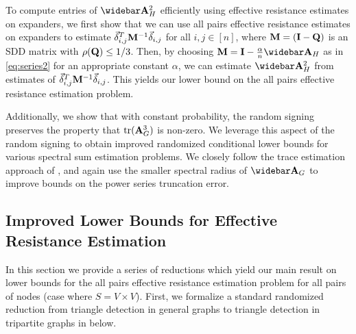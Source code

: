 To compute entries of $\As_{\Gprime}^2$ efficiently using effective resistance estimates on expanders, we first show that we can use all pairs effective resistance estimates on expanders to estimate $\vec{\delta}_{i,j}^T \mathbf{M}^{-1} \vec{\delta}_{i,j}$ for all $i,j \in [n]$, where $\mathbf{M} = (\mathbf{I} - \mathbf{Q})$ is an SDD matrix with $\rho(\mathbf{Q}) \leq 1/3$. Then, by choosing $\M = \I - \frac{\alpha}{n} \As_{\Gprime}$ as in \eqref{eq:series2} for an appropriate constant $\alpha$, we can estimate $\As_{\Gprime}^2$ from estimates of $\vec{\delta}_{i,j}^T \mathbf{M}^{-1} \vec{\delta}_{i,j}$. This yields our lower bound on the all pairs effective resistance estimation problem.

Additionally, we show that with constant probability, the random signing preserves the property that $\mathrm{tr}(\mathbf{A}_G^3)$ is non-zero. We leverage this aspect of the random signing to obtain improved randomized conditional lower bounds for various spectral sum estimation problems.  We closely follow the trace estimation approach of \cite{musco2017spectrum}, and again use the smaller spectral radius of $\As_G$ to improve bounds on the power series truncation error.

\subsection{Improved Lower Bounds for Effective Resistance Estimation}\label{sec:improved_lower_bounds_effres}
In this section we provide a series of reductions which yield our main result on lower bounds for the all pairs effective resistance estimation problem for all pairs of nodes (case where $S = V \times V$). First, we formalize a standard randomized reduction from triangle detection in general graphs to triangle detection in tripartite graphs in  below.


